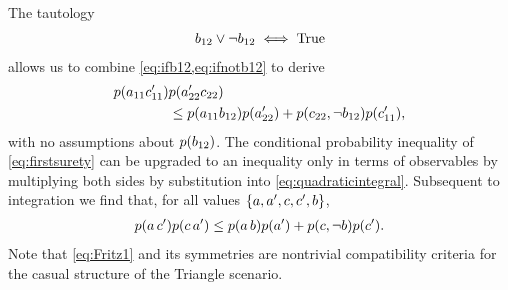 \begin{EDITING...}
The tautology
\begin{align*}
b_{12} \lor \lnot b_{12} \iff \mbox{True}
\end{align*}
allows us to combine \cref{eq:ifb12,eq:ifnotb12} to derive
\begin{align}\begin{split}\label{eq:firstsurety}
\p{a_{11} c'_{11}}&\p{a'_{22} c_{22}}
\\&\leq \p{a_{11} b_{12}}\p{a'_{22}}+\p{c_{22},\nb_{12}}\p{c'_{11}},
\end{split}\end{align}
with no assumptions about $\p{b_{12}}$.
The conditional probability inequality of \cref{eq:firstsurety} can be upgraded to an inequality only in terms of observables by multiplying both sides by substitution into \cref{eq:quadraticintegral}. Subsequent to integration we find that, 
for all values $\left\lbrace a,a',c,c',b\right\rbrace$,
\begin{align}\label{eq:Fritz1}
\p{a\, c'}\p{c\, a'}\leq \p{a\, b}\p{a'}+\p{c,\nb}\p{c'}.
\end{align}
Note that \cref{eq:Fritz1} and its symmetries are nontrivial compatibility criteria for the casual structure of the Triangle scenario. 


\end{EDITING...}
